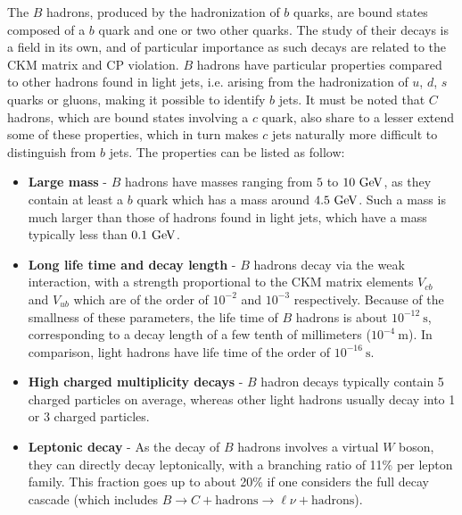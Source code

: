     The $B$ hadrons, produced by the hadronization of $b$ quarks, are bound states composed
    of a $b$ quark and one or two other quarks. The study of their decays is
    a field in its own, and of particular importance as such decays are related to the
    CKM matrix and CP violation. $B$ hadrons have particular properties compared to other hadrons
    found in light jets, i.e. arising from the hadronization of $u$, $d$, $s$ quarks or
    gluons, making it possible to identify $b$ jets. It must be noted that $C$ hadrons,
    which are bound states involving a $c$ quark, also share to a lesser extend some of these
    properties, which in turn makes $c$ jets naturally more difficult to distinguish
    from $b$ jets. The properties can be listed as follow:
    \begin{itemize}
        \item \textbf{Large mass} - $B$ hadrons have masses ranging from $5$ to $10~\text{GeV}$, as
              they contain at least a $b$ quark which has a mass around $4.5~\text{GeV}$. Such a mass is
              much larger than those of hadrons found in light jets, which have a mass
              typically less than $0.1~\text{GeV}$.
        \item \textbf{Long life time and decay length} - $B$ hadrons decay via the weak
              interaction, with a strength proportional to the CKM matrix elements $V_{cb}$ and $V_{ub}$
              which are of the order of $10^{-2}$ and $10^{-3}$ respectively. Because of
              the smallness of these parameters, the life time of $B$ hadrons is about
              $10^{-12}~\text{s}$, corresponding to a decay length of a few tenth of millimeters
              ($10^{-4}~\text{m}$). In comparison, light hadrons have life time of the order
              of $10^{-16}~\text{s}$.
        \item \textbf{High charged multiplicity decays} - $B$ hadron decays typically
              contain 5 charged particles on average, whereas other light hadrons
              usually decay into 1 or 3 charged particles.
        \item \textbf{Leptonic decay} - As the decay of $B$ hadrons involves a virtual $W$ boson,
              they can directly decay leptonically, with a branching ratio of
              11\% per lepton family. This fraction goes up to about 20\% if one
              considers the full decay cascade (which includes $B \rightarrow C +
              \text{hadrons} \rightarrow \ell\nu + \text{hadrons}$).
    \end{itemize}

